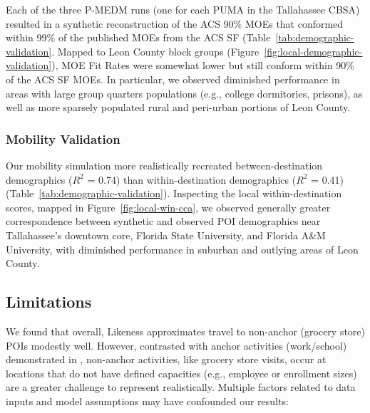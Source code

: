 



Each of the three P-MEDM runs (one for each PUMA in the Tallahassee CBSA) resulted in a synthetic reconstruction of the ACS 90\% MOEs that conformed within 99\% of the published MOEs from the ACS SF (Table~\ref{tab:demographic-validation}. Mapped to Leon County block groups (Figure~\ref{fig:local-demographic-validation}), MOE Fit Rates were somewhat lower but still conform within 90\% of the ACS SF MOEs. In particular, we observed diminished performance in areas with large group quarters populations (e.g., college dormitories, prisons), as well as more sparsely populated rural and peri-urban portions of Leon County. 

\subsubsection{Mobility Validation}



Our mobility simulation more realistically recreated between-destination demographics ($R^2$ = 0.74) than within-destination demographics ($R^2$ = 0.41) (Table~\ref{tab:demographic-validation}). Inspecting the local within-destination scores, mapped in Figure~\ref{fig:local-win-cca}, we observed generally greater correspondence between synthetic and observed POI demographics near Tallahassee's downtown core, Florida State University, and Florida A\&M University, with diminished performance in suburban and outlying areas of Leon County. 

\subsection{Limitations}\label{section:limitations}

We found that overall, Likeness approximates travel to non-anchor (grocery store) POIs modestly well. However, contrasted with anchor activities (work/school) demonstrated in \cite{likeness-scipy-paper-2022}, non-anchor activities, like grocery store visits, occur at locations that do not have defined capacities (e.g., employee or enrollment sizes) are a greater challenge to represent realistically. Multiple factors related to data inputs and model assumptions may have confounded our results:

